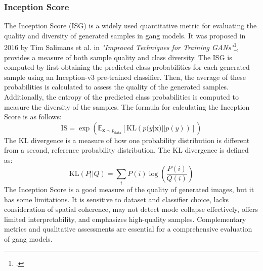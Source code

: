 \subsubsection{Inception Score}
\label{subsubsec:inception-score}
The Inception Score (\gls{ISG}\glsfirstoccur) is a widely used quantitative metric for evaluating the quality and diversity of generated samples in \gls{gang} models.
It was proposed in 2016 by Tim Salimans et al. in \emph{"Improved Techniques for Training GANs"}\footcite{paper:salimans2016improved}, provides a measure of both sample quality and class diversity. 
The \gls{ISG} is computed by first obtaining the predicted class probabilities for each generated sample using an Inception-v3 pre-trained classifier. 
Then, the average of these probabilities is calculated to assess the quality of the generated samples. 
Additionally, the entropy of the predicted class probabilities is computed to measure the diversity of the samples. 
The formula for calculating the Inception Score is as follows:
\begin{equation}
    \label{eq:inception-score}
    \text{IS} = \exp \left( \mathbb{E}_{\mathbf{x} \sim p_{\text{data}}} \left[ \text{KL} \left( p(y|\mathbf{x}) || p(y) \right) \right] \right)
\end{equation}
The KL divergence is a measure of how one probability distribution is different from a second, reference probability distribution.
The KL divergence is defined as:
\begin{equation}
    \label{eq:kl-divergence}
    \text{KL}(P || Q) = \sum_{i} P(i) \log \left(\frac{P(i)}{Q(i)}\right)
\end{equation}
The Inception Score is a good measure of the quality of generated images, but it has some limitations.
It is sensitive to dataset and classifier choice, lacks consideration of spatial coherence, may not detect mode collapse effectively, offers limited interpretability, and emphasizes high-quality samples. 
Complementary metrics and qualitative assessments are essential for a comprehensive evaluation of \gls{gang} models.
